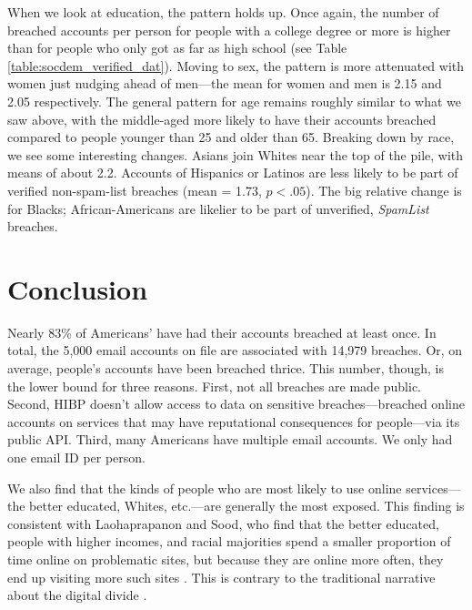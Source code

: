 \documentclass[sigconf]{acmart}
\begin{document}


When we look at education, the pattern holds up. Once again, the number of breached accounts per person for people with a college degree or more is higher than for people who only got as far as high school (see Table \ref{table:socdem_verified_dat}). Moving to sex, the pattern is more attenuated with women just nudging ahead of men---the mean for women and men is 2.15 and 2.05 respectively.  The general pattern for age remains roughly similar to what we saw above, with the middle-aged more likely to have their accounts breached compared to people younger than 25 and older than 65. Breaking down by race, we see some interesting changes. Asians join Whites near the top of the pile, with means of about 2.2. Accounts of Hispanics or Latinos are less likely to be part of verified non-spam-list breaches (mean = 1.73, $p < .05$). The big relative change is for Blacks; African-Americans are likelier to be part of unverified, {\it SpamList} breaches.

\section{Conclusion}

Nearly 83\% of Americans' have had their accounts breached at least once. In total, the 5,000 email accounts on file are associated with 14,979 breaches. Or, on average, people's accounts have been breached thrice. This number, though, is the lower bound for three reasons. First, not all breaches are made public. Second, HIBP doesn't allow access to data on sensitive breaches---breached online accounts on services that may have reputational consequences for people---via its public API. Third, many Americans have multiple email accounts. We only had one email ID per person. 

We also find that the kinds of people who are most likely to use online services---the better educated, Whites, etc.---are generally the most exposed. This finding is consistent with Laohaprapanon and Sood, who find that the better educated, people with higher incomes, and racial majorities spend a smaller proportion of time online on problematic sites, but because they are online more often, they end up visiting more such sites \cite{laohaprapanon}. This is contrary to the traditional narrative about the digital divide \cite{van2011internet}.

\clearpage


\end{document}

